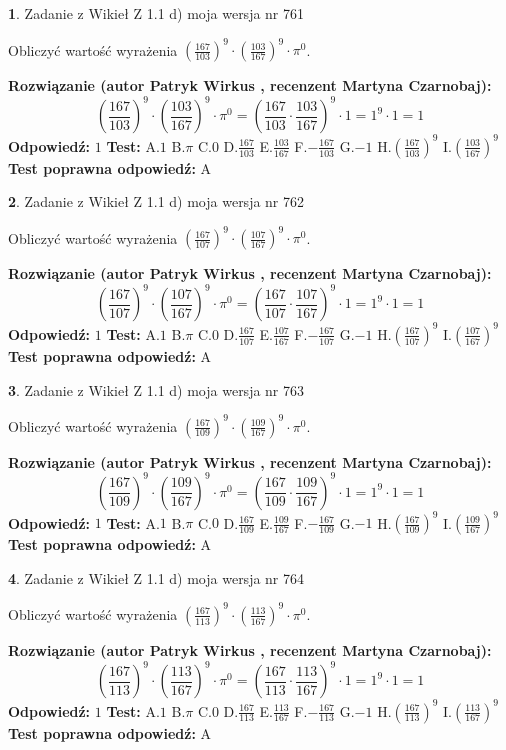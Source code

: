 \documentclass[12pt, a4paper]{article}
\theoremstyle{definition} %
\newtheorem{zad}{}
\newcommand{\zadStart}[1]{\begin{zad}#1\newline}
\newcommand{\zadStop}{\end{zad}}
\newcommand{\rozwStart}[2]{\noindent \textbf{Rozwiązanie (autor #1 , recenzent #2): }\newline}
\newcommand{\rozwStop}{\newline}
\newcommand{\odpStart}{\noindent \textbf{Odpowiedź:}\newline}
\newcommand{\odpStop}{\newline}
\newcommand{\testStart}{\noindent \textbf{Test:}\newline}
\newcommand{\testStop}{\newline}
\newcommand{\kluczStart}{\noindent \textbf{Test poprawna odpowiedź:}\newline}
\newcommand{\kluczStop}{\newline}
\begin{document}
\zadStart{Zadanie z Wikieł Z 1.1 d) moja wersja nr 761}

Obliczyć wartość wyrażenia $(\frac{167}{103})^{9} \cdot (\frac{103}{167})^{9} \cdot \pi^{0}$.
\zadStop
\rozwStart{Patryk Wirkus}{Martyna Czarnobaj}
$$(\frac{167}{103})^{9} \cdot (\frac{103}{167})^{9} \cdot \pi^{0} = (\frac{167}{103} \cdot \frac{103}{167})^{9} \cdot 1 = 1^{9} \cdot 1 = 1$$
\rozwStop
\odpStart
$1$
\odpStop
\testStart
A.$1$ B.$\pi$ C.$0$ D.$\frac{167}{103}$ E.$\frac{103}{167}$
F.$-\frac{167}{103}$ G.$-1$
H.$(\frac{167}{103})^{9}$
I.$(\frac{103}{167})^{9}$
\testStop
\kluczStart
A
\kluczStop



\zadStart{Zadanie z Wikieł Z 1.1 d) moja wersja nr 762}

Obliczyć wartość wyrażenia $(\frac{167}{107})^{9} \cdot (\frac{107}{167})^{9} \cdot \pi^{0}$.
\zadStop
\rozwStart{Patryk Wirkus}{Martyna Czarnobaj}
$$(\frac{167}{107})^{9} \cdot (\frac{107}{167})^{9} \cdot \pi^{0} = (\frac{167}{107} \cdot \frac{107}{167})^{9} \cdot 1 = 1^{9} \cdot 1 = 1$$
\rozwStop
\odpStart
$1$
\odpStop
\testStart
A.$1$ B.$\pi$ C.$0$ D.$\frac{167}{107}$ E.$\frac{107}{167}$
F.$-\frac{167}{107}$ G.$-1$
H.$(\frac{167}{107})^{9}$
I.$(\frac{107}{167})^{9}$
\testStop
\kluczStart
A
\kluczStop



\zadStart{Zadanie z Wikieł Z 1.1 d) moja wersja nr 763}

Obliczyć wartość wyrażenia $(\frac{167}{109})^{9} \cdot (\frac{109}{167})^{9} \cdot \pi^{0}$.
\zadStop
\rozwStart{Patryk Wirkus}{Martyna Czarnobaj}
$$(\frac{167}{109})^{9} \cdot (\frac{109}{167})^{9} \cdot \pi^{0} = (\frac{167}{109} \cdot \frac{109}{167})^{9} \cdot 1 = 1^{9} \cdot 1 = 1$$
\rozwStop
\odpStart
$1$
\odpStop
\testStart
A.$1$ B.$\pi$ C.$0$ D.$\frac{167}{109}$ E.$\frac{109}{167}$
F.$-\frac{167}{109}$ G.$-1$
H.$(\frac{167}{109})^{9}$
I.$(\frac{109}{167})^{9}$
\testStop
\kluczStart
A
\kluczStop



\zadStart{Zadanie z Wikieł Z 1.1 d) moja wersja nr 764}

Obliczyć wartość wyrażenia $(\frac{167}{113})^{9} \cdot (\frac{113}{167})^{9} \cdot \pi^{0}$.
\zadStop
\rozwStart{Patryk Wirkus}{Martyna Czarnobaj}
$$(\frac{167}{113})^{9} \cdot (\frac{113}{167})^{9} \cdot \pi^{0} = (\frac{167}{113} \cdot \frac{113}{167})^{9} \cdot 1 = 1^{9} \cdot 1 = 1$$
\rozwStop
\odpStart
$1$
\odpStop
\testStart
A.$1$ B.$\pi$ C.$0$ D.$\frac{167}{113}$ E.$\frac{113}{167}$
F.$-\frac{167}{113}$ G.$-1$
H.$(\frac{167}{113})^{9}$
I.$(\frac{113}{167})^{9}$
\testStop
\kluczStart
A
\kluczStop
\end{document}
